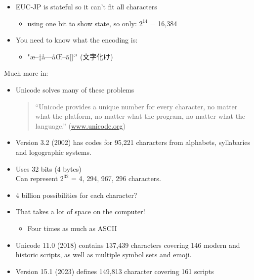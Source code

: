 \documentclass[a4paper,landscape,headrule,footrule,xetex]{foils}
\begin{document}
\begin{itemize}
\item EUC-JP is stateful so it can't fit all characters
  \begin{itemize}
  \item using one bit to show state, so only: $2^{14}$ = 16,384
  \end{itemize}
\item You need to know what the encoding is:
\begin{itemize}
\item "æ–‡å­—åŒ–ã[]‘" (文字化け)
\end{itemize}
\end{itemize}

\noindent Much more in: \\


\begin{itemize}
\item Unicode solves many of these problems
  \begin{quote}
    “Unicode provides a unique number for every character, no matter what the platform, no matter what the program, no matter what the language.” (\url{www.unicode.org})
\end{quote}
\end{itemize}




\begin{itemize}
\item Version 3.2 (2002) has codes for 95,221 characters from alphabets, syllabaries and logographic systems.
\item Uses 32 bits (4 bytes) 
  \\ Can represent $2^{32}$ = 4, 294, 967, 296 characters.
\item 4 billion possibilities for each character?
\item That takes a lot of space on the computer!
  \begin{itemize}
  \item Four times as much as ASCII
  \end{itemize}
\item Unicode 11.0 (2018) contains 137,439 characters
  covering 146 modern and historic scripts, as well as multiple symbol
  sets and emoji.
\item Version 15.1 (2023)  defines 149,813 character covering 161 scripts 
\end{itemize}
\end{document}
